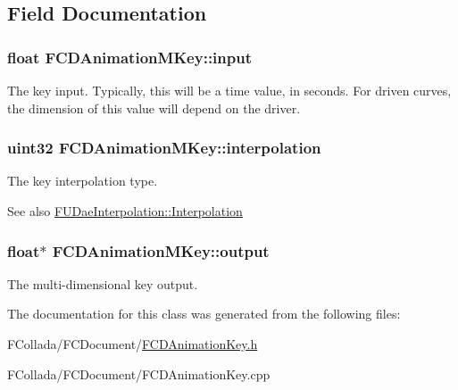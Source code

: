 \subsection{Field Documentation}
\hypertarget{classFCDAnimationMKey_a23e2a29dcce4b317979da21ec48f8e68}{
\subsubsection[{input}]{\setlength{\rightskip}{0pt plus 5cm}float {\bf FCDAnimationMKey::input}}}
\label{classFCDAnimationMKey_a23e2a29dcce4b317979da21ec48f8e68}
The key input. Typically, this will be a time value, in seconds. For driven curves, the dimension of this value will depend on the driver. \hypertarget{classFCDAnimationMKey_afde626bbddacb9897d80a6158f1a8e2a}{
\subsubsection[{interpolation}]{\setlength{\rightskip}{0pt plus 5cm}uint32 {\bf FCDAnimationMKey::interpolation}}}
\label{classFCDAnimationMKey_afde626bbddacb9897d80a6158f1a8e2a}
The key interpolation type. \begin{DoxySeeAlso}{See also}
\hyperlink{namespaceFUDaeInterpolation_a209a941c2fb6ece1325352968aa0374f}{FUDaeInterpolation::Interpolation} 
\end{DoxySeeAlso}
\hypertarget{classFCDAnimationMKey_a44bfaf4f29f3946f9a3ffe0db81828cb}{
\subsubsection[{output}]{\setlength{\rightskip}{0pt plus 5cm}float$\ast$ {\bf FCDAnimationMKey::output}}}
\label{classFCDAnimationMKey_a44bfaf4f29f3946f9a3ffe0db81828cb}
The multi-\/dimensional key output. 

The documentation for this class was generated from the following files:\begin{DoxyCompactItemize}
\item 
FCollada/FCDocument/\hyperlink{FCDAnimationKey_8h}{FCDAnimationKey.h}\item 
FCollada/FCDocument/FCDAnimationKey.cpp\end{DoxyCompactItemize}
